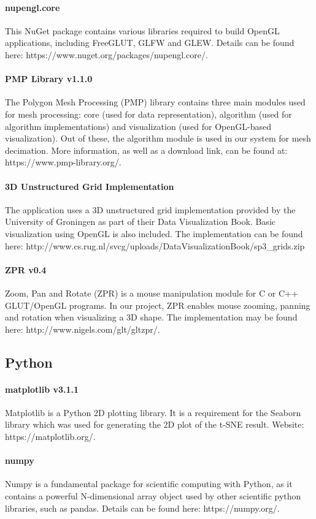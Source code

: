 \documentclass{bigdata}
\begin{document}
\paragraph{nupengl.core}
This NuGet package contains various libraries required to build OpenGL applications, including FreeGLUT, GLFW and GLEW. Details can be found here: https://www.nuget.org/packages/nupengl.core/.
\paragraph{PMP Library v1.1.0}
The Polygon Mesh Processing (PMP) library contains three main modules used for mesh processing: core (used for data representation), algorithm (used for algorithm implementations) and visualization (used for OpenGL-based visualization). Out of these, the algorithm module is used in our system for mesh decimation. More information, as well as a download link, can be found at: https://www.pmp-library.org/.
\paragraph{3D Unstructured Grid Implementation}
The application uses a 3D unstructured grid implementation provided by the University of Groningen as part of their Data Visualization Book. Basic visualization using OpenGL is also included. The implementation can be found here: http://www.cs.rug.nl/svcg/uploads/DataVisualizationBook/sp3\_grids.zip
\paragraph{ZPR v0.4}
Zoom, Pan and Rotate (ZPR) is a mouse manipulation module for C or C++ GLUT/OpenGL programs. In our project, ZPR enables mouse zooming, panning and rotation when visualizing a 3D shape. The implementation may be found here: http://www.nigels.com/glt/gltzpr/.

\subsection{Python}
\paragraph{matplotlib v3.1.1}
Matplotlib is a Python 2D plotting library. It is a requirement for the Seaborn library which was used for generating the 2D plot of the t-SNE result. Website: https://matplotlib.org/.
\paragraph{numpy}
Numpy is a fundamental package for scientific computing with Python, as it contains a powerful N-dimensional array object used by other scientific python libraries, such as pandas. Details can be found here: https://numpy.org/.
\end{document}
